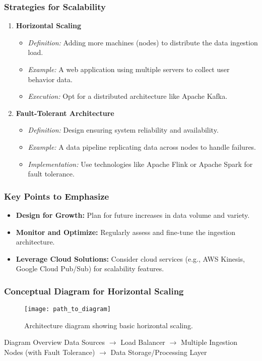 \documentclass{beamer}
\begin{document}
\begin{frame}[fragile]
    \frametitle{Strategies for Scalability}
    \begin{enumerate}
        \item \textbf{Horizontal Scaling}
        \begin{itemize}
            \item \textit{Definition:} Adding more machines (nodes) to distribute the data ingestion load.
            \item \textit{Example:} A web application using multiple servers to collect user behavior data.
            \item \textit{Execution:} Opt for a distributed architecture like Apache Kafka.
        \end{itemize}
        
        \item \textbf{Fault-Tolerant Architecture}
        \begin{itemize}
            \item \textit{Definition:} Design ensuring system reliability and availability.
            \item \textit{Example:} A data pipeline replicating data across nodes to handle failures.
            \item \textit{Implementation:} Use technologies like Apache Flink or Apache Spark for fault tolerance.
        \end{itemize}
    \end{enumerate}
\end{frame}

\begin{frame}[fragile]
    \frametitle{Key Points to Emphasize}
    \begin{itemize}
        \item \textbf{Design for Growth:} Plan for future increases in data volume and variety.
        \item \textbf{Monitor and Optimize:} Regularly assess and fine-tune the ingestion architecture.
        \item \textbf{Leverage Cloud Solutions:} Consider cloud services (e.g., AWS Kinesis, Google Cloud Pub/Sub) for scalability features.
    \end{itemize}
\end{frame}

\begin{frame}[fragile]
    \frametitle{Conceptual Diagram for Horizontal Scaling}
    \begin{figure}
        \centering
        \texttt{[image: path\_to\_diagram]} %
        \caption{Architecture diagram showing basic horizontal scaling.}
        \label{fig:horizontal_scaling}
    \end{figure}
    \begin{block}{Diagram Overview}
        Data Sources $\rightarrow$ Load Balancer $\rightarrow$ Multiple Ingestion Nodes (with Fault Tolerance) $\rightarrow$ Data Storage/Processing Layer
    \end{block}
\end{frame}
\end{document}
